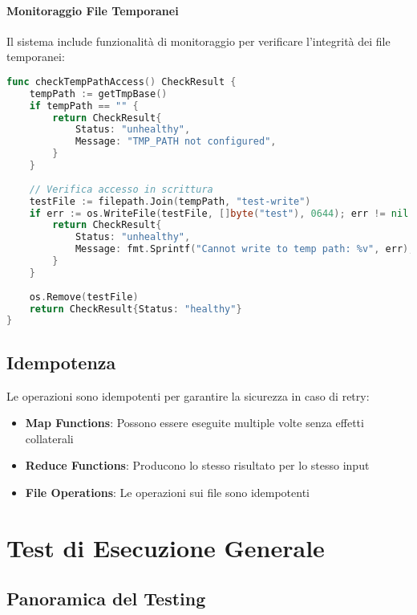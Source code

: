 \documentclass[12pt,a4paper]{article}
\begin{document}
\paragraph{Monitoraggio File Temporanei}

Il sistema include funzionalità di monitoraggio per verificare l'integrità dei file temporanei:

\begin{lstlisting}[language=Go, caption=Health check per file temporanei]
func checkTempPathAccess() CheckResult {
    tempPath := getTmpBase()
    if tempPath == "" {
        return CheckResult{
            Status: "unhealthy",
            Message: "TMP_PATH not configured",
        }
    }
    
    // Verifica accesso in scrittura
    testFile := filepath.Join(tempPath, "test-write")
    if err := os.WriteFile(testFile, []byte("test"), 0644); err != nil {
        return CheckResult{
            Status: "unhealthy",
            Message: fmt.Sprintf("Cannot write to temp path: %v", err),
        }
    }
    
    os.Remove(testFile)
    return CheckResult{Status: "healthy"}
}
\end{lstlisting}

\subsection{Idempotenza}

Le operazioni sono idempotenti per garantire la sicurezza in caso di retry:

\begin{itemize}
\item \textbf{Map Functions}: Possono essere eseguite multiple volte senza effetti collaterali
\item \textbf{Reduce Functions}: Producono lo stesso risultato per lo stesso input
\item \textbf{File Operations}: Le operazioni sui file sono idempotenti
\end{itemize}

\section{Test di Esecuzione Generale}

\subsection{Panoramica del Testing}
\end{document}
